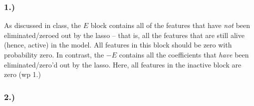 \documentclass[
]{article}
\begin{document}
\hypertarget{section-9}{%
\subsubsection{1.)}\label{section-9}}

As discussed in class, the \(E\) block contains all of the features that
have \emph{not} been eliminated/zeroed out by the lasso -- that is, all
the features that are still alive (hence, active) in the model. All
features in this block should be zero with probability zero. In
contrast, the \(-E\) contains all the coefficients that \emph{have} been
eliminated/zero'd out by the lasso. Here, all features in the inactive
block are zero (wp 1.)

\hypertarget{section-10}{%
\subsubsection{2.)}\label{section-10}}
\end{document}

